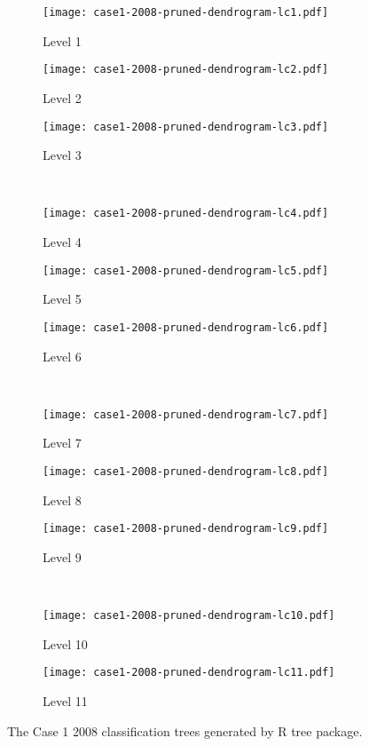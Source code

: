 \begin{appendices}

\begin{figure}[!ht] \centering
	\captionsetup[subfigure]{width=2.0in}
	\begin{subfigure}[t]{0.32\textwidth}
		\texttt{[image: case1-2008-pruned-dendrogram-lc1.pdf]}
		\caption{Level 1}
	\end{subfigure}
	\begin{subfigure}[t]{0.32\textwidth}
		\texttt{[image: case1-2008-pruned-dendrogram-lc2.pdf]}
		\caption{Level 2}
	\end{subfigure}
	\begin{subfigure}[t]{0.32\textwidth}
		\texttt{[image: case1-2008-pruned-dendrogram-lc3.pdf]}
		\caption{Level 3}
	\end{subfigure}\\
	\vspace{5pt}
	\begin{subfigure}[t]{0.32\textwidth}
		\texttt{[image: case1-2008-pruned-dendrogram-lc4.pdf]}
		\caption{Level 4}
	\end{subfigure}
	\begin{subfigure}[t]{0.32\textwidth}
		\texttt{[image: case1-2008-pruned-dendrogram-lc5.pdf]}
		\caption{Level 5}
	\end{subfigure}
	\begin{subfigure}[t]{0.32\textwidth}
		\texttt{[image: case1-2008-pruned-dendrogram-lc6.pdf]}
		\caption{Level 6}
	\end{subfigure}\\
	\vspace{5pt}	
	\begin{subfigure}[t]{0.32\textwidth}
		\texttt{[image: case1-2008-pruned-dendrogram-lc7.pdf]}
		\caption{Level 7}
	\end{subfigure}
	\begin{subfigure}[t]{0.32\textwidth}
		\texttt{[image: case1-2008-pruned-dendrogram-lc8.pdf]}
		\caption{Level 8}
	\end{subfigure}
	\begin{subfigure}[t]{0.32\textwidth}
		\texttt{[image: case1-2008-pruned-dendrogram-lc9.pdf]}
		\caption{Level 9}
	\end{subfigure}\\
	\vspace{5pt}
	\begin{subfigure}[t]{0.32\textwidth}
		\texttt{[image: case1-2008-pruned-dendrogram-lc10.pdf]}
		\caption{Level 10}
	\end{subfigure}
	\begin{subfigure}[t]{0.32\textwidth}
		\texttt{[image: case1-2008-pruned-dendrogram-lc11.pdf]}
		\caption{Level 11}
	\end{subfigure}
	\vspace{5pt}
	\caption[The Case 1 2008 classification trees generated by R tree package.]{The Case 1 2008 classification trees generated by R tree package.}
	\label{fig: appendix-fig.c3.tree}
\end{figure}


\end{appendices}
